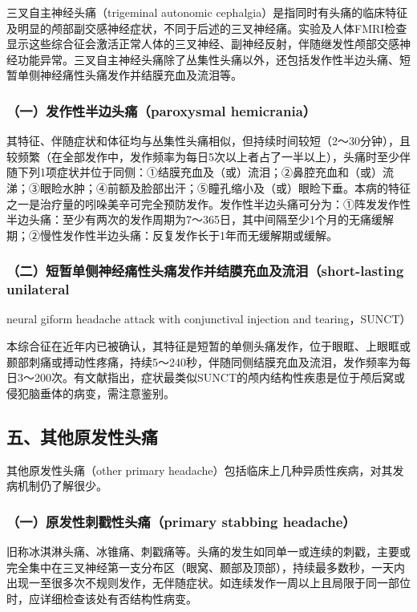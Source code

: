 三叉自主神经头痛（trigeminal autonomic
cephalgia）是指同时有头痛的临床特征及明显的颅部副交感神经症状，不同于后述的三叉神经痛。实验及人体FMRI检查显示这些综合征会激活正常人体的三叉神经、副神经反射，伴随继发性颅部交感神经功能异常。三叉自主神经头痛除了丛集性头痛以外，还包括发作性半边头痛、短暂单侧神经痛性头痛发作并结膜充血及流泪等。

\subsubsection{（一）发作性半边头痛（paroxysmal hemicrania）}

其特征、伴随症状和体征均与丛集性头痛相似，但持续时间较短（2～30分钟），且较频繁（在全部发作中，发作频率为每日5次以上者占了一半以上），头痛时至少伴随下列1项症状并位于同侧：①结膜充血及（或）流泪；②鼻腔充血和（或）流涕；③眼睑水肿；④前额及脸部出汗；⑤瞳孔缩小及（或）眼睑下垂。本病的特征之一是治疗量的吲哚美辛可完全预防发作。发作性半边头痛可分为：①阵发发作性半边头痛：至少有两次的发作周期为7～365日，其中间隔至少1个月的无痛缓解期；②慢性发作性半边头痛：反复发作长于1年而无缓解期或缓解。

\subsubsection{（二）短暂单侧神经痛性头痛发作并结膜充血及流泪（short-lasting unilateral}
neural giform headache attack with conjunctival injection and
tearing，SUNCT）

本综合征在近年内已被确认，其特征是短暂的单侧头痛发作，位于眼眶、上眼眶或颞部刺痛或搏动性疼痛，持续5～240秒，伴随同侧结膜充血及流泪，发作频率为每日3～200次。有文献指出，症状最类似SUNCT的颅内结构性疾患是位于颅后窝或侵犯脑垂体的病变，需注意鉴别。

\protect\hypertarget{text00351.html}{}{}

\subsection{五、其他原发性头痛}

其他原发性头痛（other primary
headache）包括临床上几种异质性疾病，对其发病机制仍了解很少。

\subsubsection{（一）原发性刺戳性头痛（primary stabbing headache）}

旧称冰淇淋头痛、冰锥痛、刺戳痛等。头痛的发生如同单一或连续的刺戳，主要或完全集中在三叉神经第一支分布区（眼窝、颞部及顶部），持续最多数秒，一天内出现一至很多次不规则发作，无伴随症状。如连续发作一周以上且局限于同一部位时，应详细检查该处有否结构性病变。

